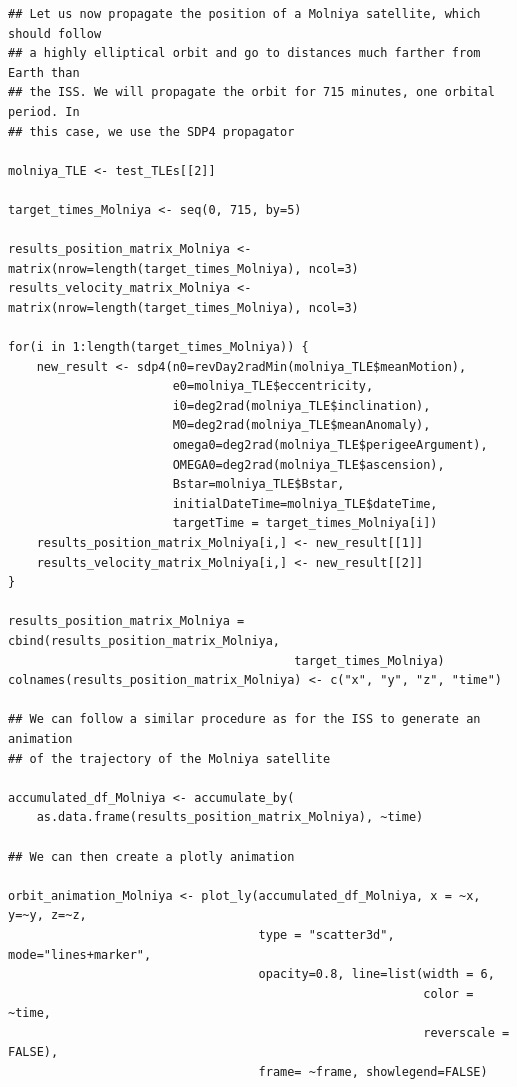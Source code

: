 \begin{verbatim}
## Let us now propagate the position of a Molniya satellite, which should follow
## a highly elliptical orbit and go to distances much farther from Earth than 
## the ISS. We will propagate the orbit for 715 minutes, one orbital period. In
## this case, we use the SDP4 propagator

molniya_TLE <- test_TLEs[[2]]

target_times_Molniya <- seq(0, 715, by=5)

results_position_matrix_Molniya <- matrix(nrow=length(target_times_Molniya), ncol=3)
results_velocity_matrix_Molniya <- matrix(nrow=length(target_times_Molniya), ncol=3)

for(i in 1:length(target_times_Molniya)) {
    new_result <- sdp4(n0=revDay2radMin(molniya_TLE$meanMotion),
                       e0=molniya_TLE$eccentricity,
                       i0=deg2rad(molniya_TLE$inclination),
                       M0=deg2rad(molniya_TLE$meanAnomaly),
                       omega0=deg2rad(molniya_TLE$perigeeArgument),
                       OMEGA0=deg2rad(molniya_TLE$ascension),
                       Bstar=molniya_TLE$Bstar,
                       initialDateTime=molniya_TLE$dateTime,
                       targetTime = target_times_Molniya[i])
    results_position_matrix_Molniya[i,] <- new_result[[1]]
    results_velocity_matrix_Molniya[i,] <- new_result[[2]]
}

results_position_matrix_Molniya = cbind(results_position_matrix_Molniya, 
                                        target_times_Molniya)
colnames(results_position_matrix_Molniya) <- c("x", "y", "z", "time")

## We can follow a similar procedure as for the ISS to generate an animation
## of the trajectory of the Molniya satellite

accumulated_df_Molniya <- accumulate_by(
    as.data.frame(results_position_matrix_Molniya), ~time)

## We can then create a plotly animation

orbit_animation_Molniya <- plot_ly(accumulated_df_Molniya, x = ~x, y=~y, z=~z, 
                                   type = "scatter3d", mode="lines+marker", 
                                   opacity=0.8, line=list(width = 6, 
                                                          color = ~time,
                                                          reverscale = FALSE), 
                                   frame= ~frame, showlegend=FALSE)


\end{verbatim}
